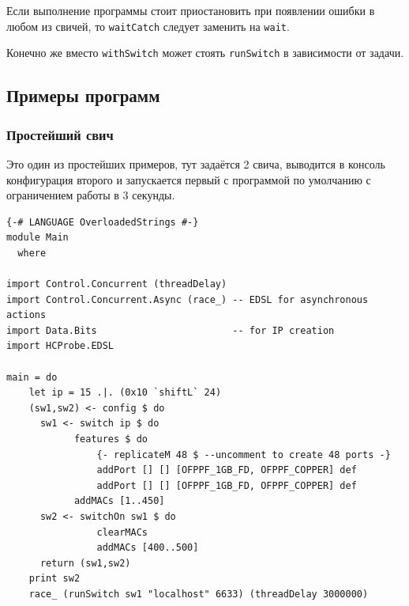 \documentclass[9pt,a4paper]{article}
\begin{document}
Если выполнение программы стоит приостановить при появлении ошибки в любом из
свичей, то \lstinline!waitCatch! следует заменить на \lstinline!wait!.

Конечно же вместо \lstinline!withSwitch! может стоять \lstinline!runSwitch!
в зависимости от задачи.

\subsection{Примеры программ}

\subsubsection{Простейший свич}

Это один из простейших примеров, тут задаётся 2 свича,
выводится в консоль конфигурация второго и запускается
первый с программой по умолчанию с ограничением работы
в 3 секунды.

\begin{lstlisting}
{-# LANGUAGE OverloadedStrings #-}
module Main
  where

import Control.Concurrent (threadDelay)
import Control.Concurrent.Async (race_) -- EDSL for asynchronous actions
import Data.Bits                        -- for IP creation
import HCProbe.EDSL

main = do 
    let ip = 15 .|. (0x10 `shiftL` 24)
    (sw1,sw2) <- config $ do
      sw1 <- switch ip $ do
            features $ do
                {- replicateM 48 $ --uncomment to create 48 ports -}
                addPort [] [] [OFPPF_1GB_FD, OFPPF_COPPER] def
                addPort [] [] [OFPPF_1GB_FD, OFPPF_COPPER] def
            addMACs [1..450]
      sw2 <- switchOn sw1 $ do
                clearMACs 
                addMACs [400..500]
      return (sw1,sw2)
    print sw2
    race_ (runSwitch sw1 "localhost" 6633) (threadDelay 3000000)
\end{lstlisting}

\end{document}
